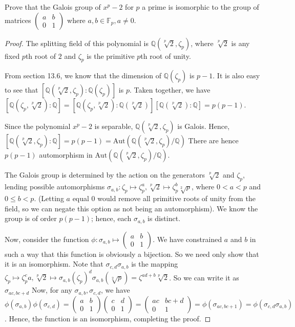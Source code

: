 \documentclass[10pt]{article}
\newcommand{\Q}{\mathbb{Q}}
\newenvironment{problem}[2][Problem]{\begin{trivlist}
		\item[\hskip \labelsep {\bfseries #1}\hskip \labelsep {\bfseries #2.}]}{\end{trivlist}}
\begin{document}
	\begin{problem}{2.5}
		Prove that the Galois group of $x^p-2$ for $p$ a prime is isomorphic to the group of matrices 
		$\begin{pmatrix}
			a & b\\
			0 & 1
		\end{pmatrix}$ where $a,b \in \mathbb{F}_p, a \not= 0$.
		\begin{proof}
			The splitting field of this polynomial is $\Q(\sqrt[p]{2}, \zeta_p)$, where $\sqrt[p]{2}$ is any fixed $p$th root of $2$ and $\zeta_p$ is the primitive $p$th root of unity. 
			
			From section 13.6, we know that the dimension of $\Q(\zeta_p)$ is $p-1$. It is also easy to see that $[\Q(\sqrt[p]{2}, \zeta_p):\Q(\zeta_p)]$ is $p$. Taken together, we have  $[\Q(\zeta_p,\sqrt[p]{2}):\Q] = [\Q(\zeta_p,\sqrt[p]{2}):\Q(\sqrt[p]{2})][\Q(\sqrt[p]{2}):\Q] = p(p-1)$.
			
			Since the polynomial $x^p-2$ is separable, $\Q(\sqrt[p]{2}, \zeta_p)$ is Galois. Hence, $[\Q(\sqrt[p]{2}, \zeta_p):\Q] = p(p-1) = \text{Aut}(\Q(\sqrt[p]{2}, \zeta_p)/\Q)$ There are hence $p(p-1)$ automorphism in $\text{Aut}(\Q(\sqrt[p]{2}, \zeta_p)/\Q)$.
			
			The Galois group is determined by the action on the generators $\sqrt[p]{2}$ and $\zeta_p$, lending possible automorphisms $\sigma_{a,b} : \zeta_p \mapsto \zeta_p^a, \sqrt[p]{2} \mapsto \zeta_p^b\sqrt[2]{p}$, where $0 < a < p$ and $0 \leq b < p$. (Letting $a$ equal $0$ would remove all primitive roots of unity from the field, so we can negate this option as not being an automorphism). We know the group is of order $p(p-1)$; hence, each $\sigma_{a,b}$ is distinct.
			
			Now, consider the function $\phi : \sigma_{a,b} \mapsto 	
			\begin{pmatrix}
				a & b\\
				0 & 1
			\end{pmatrix}$. We have constrained $a$ and $b$ in such a way that this function is obviously a bijection. So we need only show that it is an isomorphism. Note that $\sigma_{c,d}\sigma_{a,b}$ is the mapping $\zeta_p \mapsto \zeta_p^ca, \sqrt[p]{2} \mapsto \sigma_{a,b}(\zeta_p)^d\sigma_{a,b}(\sqrt[2]{p}) = \zeta^{ad+b}\sqrt[p]{2}$. So we can write it as $\sigma_{ac,bc+d}$ Now, for any $\sigma_{a,b}, \sigma_{c,d}$, we have $\phi(\sigma_{a,b})\phi(\sigma_{c,d}) = 
			\begin{pmatrix}
			a & b\\
			0 & 1
			\end{pmatrix}
			\begin{pmatrix}
			c & d\\
			0 & 1
			\end{pmatrix} = 
			\begin{pmatrix}
				ac & bc+d\\
				0 & 1
			\end{pmatrix} =
			\phi(\sigma_{ac, bc+1}) = \phi(\sigma_{c,d}\sigma_{a,b})$. Hence, the function is an isomorphism, completing the proof.
			

\end{proof}
\end{problem}
\end{document}

